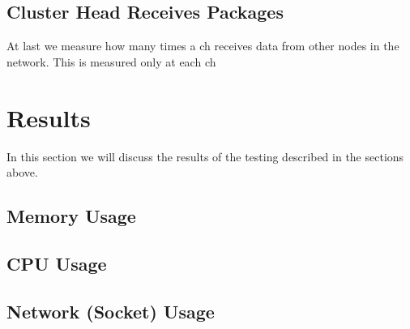 \documentclass[USenglish]{uit-thesis}
\begin{document}
\subsection{Cluster Head Receives Packages}
At last we measure how many times a \gls{ch} receives data from other nodes in the network. This is measured only at each \gls{ch}


\section{Results}

In this section we will discuss the results of the testing described in the sections above.

\subsection{Memory Usage}




\subsection{CPU Usage}
\subsection{Network (Socket) Usage}




\end{document}
